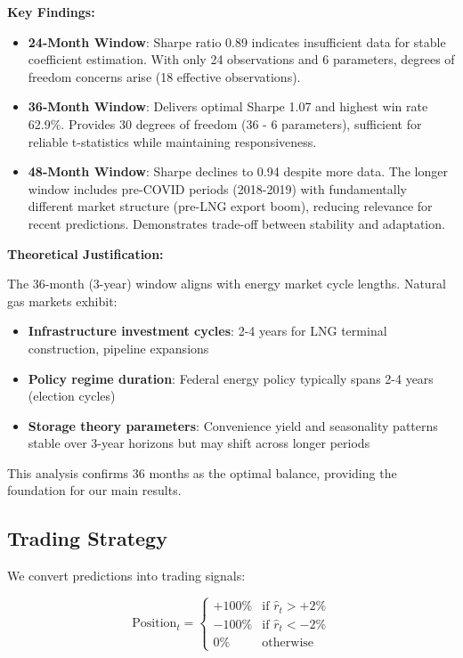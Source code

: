 \documentclass[12pt,a4paper]{article}
\begin{document}
\textbf{Key Findings:}

\begin{itemize}
    \item \textbf{24-Month Window}: Sharpe ratio 0.89 indicates insufficient data for stable coefficient estimation. With only 24 observations and 6 parameters, degrees of freedom concerns arise (18 effective observations).

    \item \textbf{36-Month Window}: Delivers optimal Sharpe 1.07 and highest win rate 62.9\%. Provides 30 degrees of freedom (36 - 6 parameters), sufficient for reliable t-statistics while maintaining responsiveness.

    \item \textbf{48-Month Window}: Sharpe declines to 0.94 despite more data. The longer window includes pre-COVID periods (2018-2019) with fundamentally different market structure (pre-LNG export boom), reducing relevance for recent predictions. Demonstrates trade-off between stability and adaptation.
\end{itemize}

\textbf{Theoretical Justification:}

The 36-month (3-year) window aligns with energy market cycle lengths. Natural gas markets exhibit:
\begin{itemize}
    \item \textbf{Infrastructure investment cycles}: 2-4 years for LNG terminal construction, pipeline expansions
    \item \textbf{Policy regime duration}: Federal energy policy typically spans 2-4 years (election cycles)
    \item \textbf{Storage theory parameters}: Convenience yield and seasonality patterns stable over 3-year horizons but may shift across longer periods
\end{itemize}

This analysis confirms 36 months as the optimal balance, providing the foundation for our main results.

\subsection{Trading Strategy}

We convert predictions into trading signals:

\begin{equation}
\text{Position}_t =
\begin{cases}
+100\% & \text{if } \hat{r}_t > +2\% \\
-100\% & \text{if } \hat{r}_t < -2\% \\
0\% & \text{otherwise}
\end{cases}
\end{equation}
\end{document}
